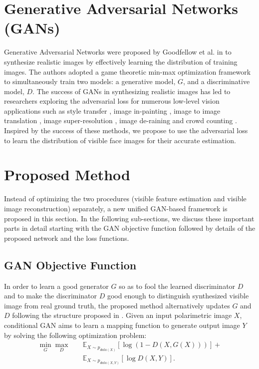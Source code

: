 \documentclass[10pt,twocolumn,letterpaper]{article}
\begin{document}
\section{Generative Adversarial Networks (GANs)}
Generative Adversarial Networks were proposed by Goodfellow et al. in \cite{GAN} to synthesize realistic images by effectively learning the distribution of training images.  The authors adopted a game theoretic min-max optimization framework to simultaneously train two models: a generative model, $G$, and a discriminative model, $D$.   The success of GANs in synthesizing realistic images has led to researchers exploring the adversarial loss for numerous low-level vision  applications such as style transfer \cite{li2016precomputed}, image in-painting \cite{pathak2016context}, image to image translation \cite{reed2016generative}, image super-resolution \cite{GAN_sisr}, image de-raining \cite{derain_2017_zhang} and crowd counting \cite{croudgan}. Inspired by the success of these methods, we propose to use the adversarial loss to learn the distribution of visible face images for their accurate estimation.





\section{Proposed Method}
Instead of optimizing the two procedures (visible feature estimation and visible image reconstruction) separately, a new unified GAN-based framework is proposed in this section. In the following sub-sections, we discuss these important parts in detail starting with the GAN objective function followed by details of the proposed network and the loss functions.

\subsection{GAN Objective Function}
In order to learn a good generator $G$ so as to fool the learned discriminator $D$ and  to make the discriminator $D$ good enough to distinguish synthesized visible image from real ground truth,  the proposed method alternatively updates $G$ and $D$ following the structure proposed in \cite{GAN_pix2pix2016,derain_2017_zhang}. Given an input polarimetric image $X$, conditional GAN aims to learn a mapping function to generate output image $Y$ by solving the following optimization problem:
\begin{equation}\label{eq:GAN1}
\begin{split}
\min_G \max_D \quad & \mathbb E _{X\sim p_{data(X)} }[\log (1- D(X, G(X)))]+\\
&\mathbb E _{X\sim p_{data(X,Y)}}[\log D(X,Y)].
\end{split}
 \end{equation}
\end{document}
